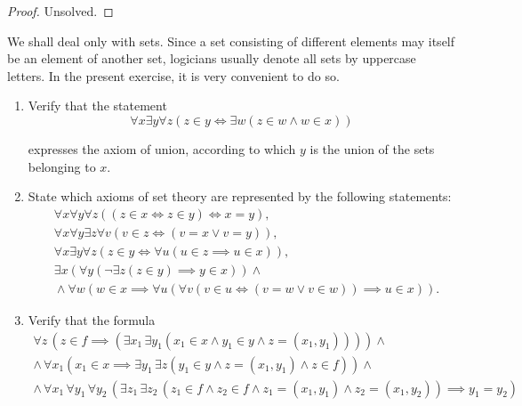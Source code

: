 \begin{proof}
    Unsolved.
\end{proof}
\newpage

\begin{exercise}
    We shall deal only with sets. Since a set consisting of different elements may
    itself be an element of another set, logicians usually denote all sets by uppercase
    letters. In the present exercise, it is very convenient to do so.
    \begin{enumerate}[label={(\alph*)}]
        \item Verify that the statement
              \[
                  \forall x \exists y \forall z \left( z\in y \Leftrightarrow \exists w (z\in w \land w\in x) \right)
              \]

              expresses the axiom of union, according to which $y$ is the union of the sets belonging to $x$.
        \item State which axioms of set theory are represented by the following statements:
              \begin{align*}
                   & \forall x\forall y\forall z\left((z\in x\Leftrightarrow z\in y) \Leftrightarrow x = y\right),                                                                   \\
                   & \forall x\forall y\exists z\forall v\left( v\in z \Leftrightarrow (v = x\lor v = y) \right),                                                                    \\
                   & \forall x\exists y\forall z\left(z\in y\Leftrightarrow \forall u (u\in z\implies u\in x)\right),                                                                \\
                   & \exists x\left(\forall y \left(\neg \exists z(z\in y)\implies y\in x\right)\right) \land                                                                        \\
                   & \phantom{   } \land \forall w\left(w\in x\implies \forall u\left( \forall v\left(v\in u\Leftrightarrow (v = w\lor v\in w)\right)\implies u\in x \right)\right).
              \end{align*}
        \item Verify that the formula
              \begin{gather*}
                  \forall z\, \left( z\in f \implies \left( \exists x_{1}\,\exists y_{1} \left( x_{1}\in x\land y_{1}\in y\land z = (x_{1}, y_{1}) \right) \right) \right) \land \\
                  \land\, \forall x_{1}\left( x_{1}\in x \implies \exists y_{1}\,\exists z \left( y_{1}\in y\land z = (x_{1}, y_{1})\land z\in f \right) \right) \land \\
                  \land\, \forall x_{1}\,\forall y_{1}\,\forall y_{2}\, \left( \exists z_{1}\,\exists z_{2}\,\left( z_{1}\in f\land z_{2}\in f \land z_{1} = (x_{1}, y_{1}) \land z_{2} = (x_{1}, y_{2}) \right) \implies y_{1} = y_{2} \right)
              \end{gather*}


\end{enumerate}
\end{exercise}

